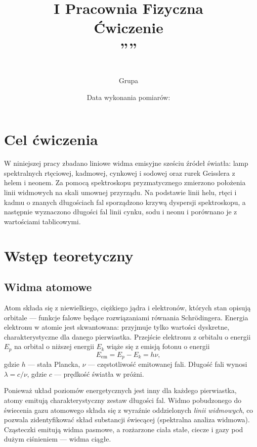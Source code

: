 \documentclass[12pt, a4paper]{article}
\title{
    \large I Pracownia Fizyczna \\[0.5em]
    \textbf{Ćwiczenie \nrCwiczenia} \\[0.3em]
    \LARGE \tytul\space''\codeword''
}
\author{
    \autor\\
     Grupa \nrGrupy}
\date{
    Data wykonania pomiarów: \dataWykonania\\
}
\begin{document}

\maketitle
\thispagestyle{empty}
\newpage

\section{Cel ćwiczenia}

W niniejszej pracy zbadano liniowe widma emisyjne sześciu źródeł światła: lamp
spektralnych rtęciowej, kadmowej, cynkowej i sodowej oraz rurek Geisslera z helem
i neonem. Za pomocą spektroskopu pryzmatycznego zmierzono położenia linii widmowych
na skali umownej przyrządu. Na podstawie linii helu, rtęci i kadmu o znanych długościach
fal sporządzono krzywą dyspersji spektroskopu, a następnie wyznaczono długości fal linii
cynku, sodu i neonu i porównano je z wartościami tablicowymi.

\section{Wstęp teoretyczny}

\subsection{Widma atomowe}

Atom składa się z niewielkiego, ciężkiego jądra i elektronów, których stan opisują
orbitale --- funkcje falowe będące rozwiązaniami równania Schrödingera. Energia elektronu
w atomie jest skwantowana: przyjmuje tylko wartości dyskretne, charakterystyczne dla
danego pierwiastka. Przejście elektronu z orbitalu o energii $E_p$ na orbital o niższej
energii $E_k$ wiąże się z emisją fotonu o energii~\cite{skrypt}
\begin{equation}
    E_\text{em} = E_p - E_k = h\nu,
    \label{eq:emission}
\end{equation}
gdzie $h$ --- stała Plancka, $\nu$ --- częstotliwość emitowanej fali. Długość fali
wynosi $\lambda = c/\nu$, gdzie $c$ --- prędkość światła w próżni.

Ponieważ układ poziomów energetycznych jest inny dla każdego pierwiastka, atomy
emitują charakterystyczny zestaw długości fal. Widmo pobudzonego do świecenia gazu
atomowego składa się z wyraźnie oddzielonych \emph{linii widmowych}, co pozwala
zidentyfikować skład substancji świecącej (spektralna analiza widmowa). Cząsteczki
emitują widma pasmowe, a rozżarzone ciała stałe, ciecze i gazy pod dużym ciśnieniem ---
widma ciągłe.
\end{document}
